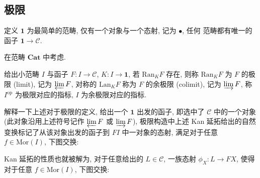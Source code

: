\subsection{极限}

定义 \(\mathbf{1}\) 为最简单的范畴, 仅有一个对象与一个态射, 记为 \(\bullet\), 任何
范畴都有唯一的函子 \(\mathbf{1} \to \mathcal{C}\).

\begin{definition}[极限]
    在范畴 \(\mathbf{Cat}\) 中考虑.
    
    给出小范畴 \(I\) 与函子 \(F : I \to \mathcal{C}\), \(K : I \to \mathbf{1}\), 
    若 \(\mathrm{Ran}_K F\) 存在, 则称 \(\mathrm{Ran}_K F\) 为 \(F\) 的极限 (limit), 记为 \(\varprojlim F\),
    对称的 \(\mathrm{Lan}_K F\) 称为 \(F\) 的余极限 (colimit), 记为 \(\varinjlim F\), 称 \(I^\mathrm{op}\) 为极限对应的指标, \(I\) 为余极限对应的指标.
\end{definition}

解释一下上述对于极限的定义, 给出一个 \(\mathbf{1}\) 出发的函子, 即选中了 \(\mathcal{C}\) 中的一个对象 (此对象沿用上述符号记作 \(\varprojlim F\) 或 \(\varinjlim F\)),
极限构造中上述 Kan 延拓给出的自然变换标记了从该对象出发的函子到 \(F I\) 中一对象的态射, 满足对于任意 \(f \in \mathrm{Mor}(I)\), 下图交换:

\begin{center}
\end{center}

Kan 延拓的性质也就被解为, 对于任意给出的 \(L \in \mathcal{C}\), 一族态射 \(\phi_X : L \to F X\), 使得对于任意 \(f \in \mathrm{Mor}(I)\), 下图交换:

\begin{center}
\end{center}

